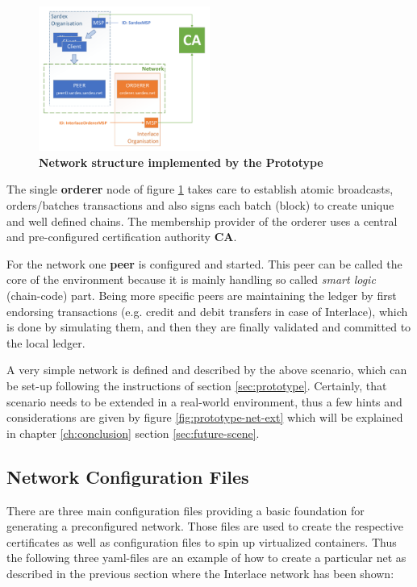 \begin{figure}[htbp]
  \centering
  \includegraphics[width=0.5\textwidth, clip, trim=1mm 1mm 1mm 1mm]{Figures/basic-network}
  \caption{\bf\small Network structure implemented by the Prototype}
  \label{fig:prototype-net}
\end{figure}

The single \textbf{orderer} node of figure \ref{fig:prototype-net} takes care to establish atomic broadcasts, orders/batches transactions and also signs each batch (block) to create unique and well defined chains. The membership provider of the orderer uses a central and pre-configured certification authority \textbf{CA}.

For the network one \textbf{peer} is configured and started. This peer can be called the core of the environment because it is mainly handling so called \textit{smart logic} (chain-code) part. Being more specific peers are maintaining the ledger by first endorsing transactions (e.g. credit and debit transfers in case of Interlace), which is done by simulating them, and then they are finally validated and committed to the local ledger.

A very simple network is defined and described by the above scenario, which can be set-up following the instructions of section \ref{sec:prototype}. Certainly, that scenario needs to be extended in a real-world environment, thus a few hints and considerations are given by figure \ref{fig:prototype-net-ext} which will be explained in chapter \ref{ch:conclusion} section \ref{sec:future-scene}.

\subsection{Network Configuration Files}
\label{sec:net-conf-files}

There are three main configuration files providing a basic foundation for generating a preconfigured network. Those files are used to create the respective certificates as well as configuration files to spin up virtualized containers. Thus the following three yaml-files are an example of how to create a particular net as described in the previous section where the Interlace network has been shown:

